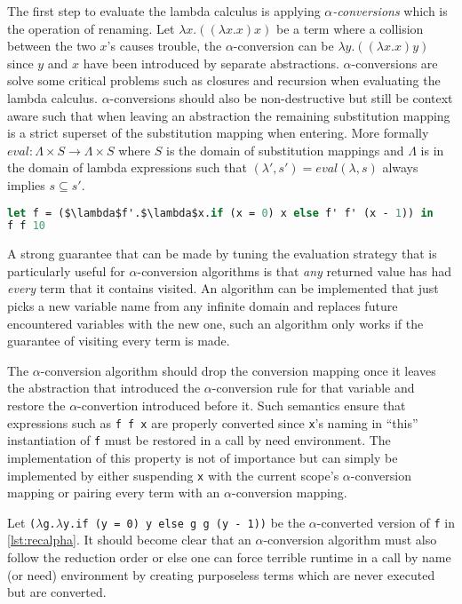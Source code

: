 \documentclass[11pt,oneside,a4paper]{report}
\begin{document}
The first step to evaluate the lambda calculus is applying \textit{$\alpha$-conversions} which is the operation of renaming.
Let $\lambda x . ((\lambda x . x) x)$ be a term where a collision between the two $x$'s causes trouble, the $\alpha$-conversion can be $\lambda y . ((\lambda x . x) y)$ since $y$ and $x$ have been introduced by separate abstractions.
$\alpha$-conversions are solve some critical problems such as closures and recursion when evaluating the lambda calculus.
$\alpha$-conversions should also be non-destructive but still be context aware such that when leaving an abstraction the remaining substitution mapping is a strict superset of the substitution mapping when entering.
More formally $\textit{eval}: \Lambda \times S \rightarrow \Lambda \times S$ where $S$ is the domain of substitution mappings and $\Lambda$ is in the domain of lambda expressions such that  $(\lambda',s') = eval(\lambda, s)$ always implies $s \subseteq s'$.
\begin{lstlisting}[language=ML,caption={Recursive addition function},label={lst:recalpha},mathescape=true]
let f = ($\lambda$f'.$\lambda$x.if (x = 0) x else f' f' (x - 1)) in
f f 10
\end{lstlisting}
A strong guarantee that can be made by tuning the evaluation strategy that is particularly useful for $\alpha$-conversion algorithms is that \textit{any} returned value has had \textit{every} term that it contains visited.
An algorithm can be implemented that just picks a new variable name from any infinite domain and replaces future encountered variables with the new one, such an algorithm only works if the guarantee of visiting every term is made.
\begin{remark}
The $\alpha$-conversion algorithm should drop the conversion mapping once it leaves the abstraction that introduced the $\alpha$-conversion rule for that variable and restore the $\alpha$-convertion introduced before it.
Such semantics ensure that expressions such as \texttt{f f x} are properly converted since \texttt{x}'s naming in ``this'' instantiation of \texttt{f} must be restored in a call by need environment.
The implementation of this property is not of importance but can simply be implemented by either suspending \texttt{x} with the current scope's $\alpha$-conversion mapping or pairing every term with an $\alpha$-conversion mapping.
\end{remark}
Let \texttt{($\lambda$g.$\lambda$y.if (y = 0) y else g g (y - 1))} be the $\alpha$-converted version of \texttt{f} in \autoref{lst:recalpha}.
It should become clear that an $\alpha$-conversion algorithm must also follow the reduction order or else one can force terrible runtime in a call by name (or need) environment by creating purposeless terms which are never executed but are converted.
\end{document}
